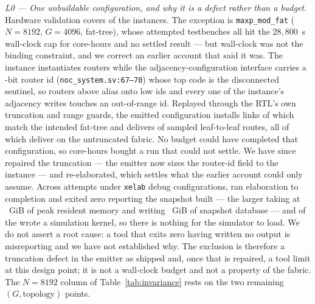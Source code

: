 \documentclass[journal,10pt]{IEEEtran}
\theoremstyle{plain}
\theoremstyle{definition}
\theoremstyle{remark}
\newcommand{\sv}[1]{\texttt{#1}}
\begin{document}
\emph{L0 --- One unbuildable configuration, and why it is a defect rather than
a budget.} Hardware validation covers \TournNInst{} of the \SuiteSize{}
instances. The exception is \sv{maxp\_mod\_fat} ($N{=}8192$, $G{=}4096$,
fat-tree), whose \MaxpAttempts{} attempted testbenches all hit the
$28{,}800$~s wall-clock cap for \MaxpCoreHours{} core-hours and no settled
result --- but wall-clock was not the binding constraint, and we correct an
earlier account that said it was. The instance instantiates \MaxpRouters{}
routers while the adjacency-configuration interface carries a
\RouterIdBits-bit router id (\sv{noc\_system.sv:67--70}) whose top code is the
disconnected sentinel, so routers above \RouterIdMax{} alias onto low ids and
every one of the instance's \MaxpAdjEntries{} adjacency writes touches an
out-of-range id. Replayed through the RTL's own truncation and range guards,
the emitted configuration installs \MaxpLinksInstalled{} links of which
\MaxpLinksCorrect{} match the intended fat-tree and delivers
\MaxpRoutesDelivered{} of \MaxpRoutesSampled{} sampled leaf-to-leaf routes,
all \MaxpRoutesSampled{} of which deliver on the untruncated fabric. No
budget could have completed that configuration, so \MaxpCoreHours{} core-hours
bought a run that could not settle. We have since repaired the truncation ---
the emitter now sizes the router-id field to the instance --- and
re-elaborated, which settles what the earlier account could only assume.
Across \MaxpElabAttempts{} attempts under \MaxpDebugCfgs{} \sv{xelab} debug
configurations, \MaxpElabClean{} ran elaboration to completion and exited zero
reporting the snapshot built --- the larger taking \MaxpElabWall{} at
\MaxpElabRss{}~GiB of peak resident memory and writing \MaxpSnapSize{}~GiB of
snapshot database --- and \MaxpKernels{} of the \MaxpElabAttempts{} wrote a
simulation kernel, so there is nothing for the simulator to load. We do not
assert a root cause: a tool that exits zero having written no output is
misreporting and we have not established why. The exclusion is therefore a
truncation defect in the emitter as shipped and, once that is repaired, a tool
limit at this design point; it is not a wall-clock budget and not a property
of the fabric. The $N{=}8192$ column of
Table~\ref{tab:invariance} rests on the two remaining $(G,\text{topology})$
points.
\end{document}
